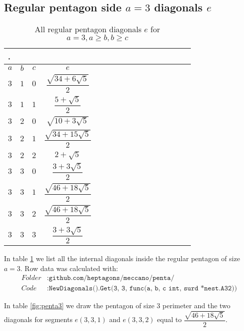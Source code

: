 \documentclass[11pt]{article}
\begin{document}
\subsection{Regular pentagon side $a=3$ diagonals $e$}

\renewcommand*{\arraystretch}{2}
\begin{longtable}{ | p{0.5cm}| *{15}{c|} }
\caption{All regular pentagon diagonals $e$ for $a=3, a \ge b, b \ge c$}.
\label{tbl:penta3}\\
\hline
$a$ & $b$ & $c$ & $e$ \\
\hline\endhead
\hline\endfoot
 $3$ & $1$ & $0$ & $\dfrac{\sqrt{34+6\sqrt5}}2$ \\
 $3$ & $1$ & $1$ & $\dfrac{5+\sqrt{5}}2$ \\ \hline
 $3$ & $2$ & $0$ & $\sqrt{10+3\sqrt5}$ \\
 $3$ & $2$ & $1$ & $\dfrac{\sqrt{34+15\sqrt5}}2$ \\
 $3$ & $2$ & $2$ & $2+\sqrt5$ \\ [1ex] \hline
 $3$ & $3$ & $0$ & $\dfrac{3+3\sqrt5}2$ \\
 $3$ & $3$ & $1$ & $\dfrac{\sqrt{46+18\sqrt5}}2$ \\
 $3$ & $3$ & $2$ & $\dfrac{\sqrt{46+18\sqrt5}}2$ \\
 $3$ & $3$ & $3$ & $\dfrac{3+3\sqrt5}2$ \\ \hline
\end{longtable}

In table \ref{tbl:penta3} we list all the internal diagonals inside the regular
pentagon of size $a=3$. Row data was calculated with:
\begin{align*}
Folder &: \texttt{github.com/heptagons/meccano/penta/}\\
Code &: \texttt{NewDiagonals().Get(3, 3, func(a, b, c int, surd *nest.A32))}
\end{align*}

In table \ref{fig:penta3} we draw the pentagon of size 3 perimeter and the two
diagonals for segments $e(3,3,1)$ and $e(3,3,2)$ equal to $\dfrac{\sqrt{46+18\sqrt5}}2$.
\end{document}
